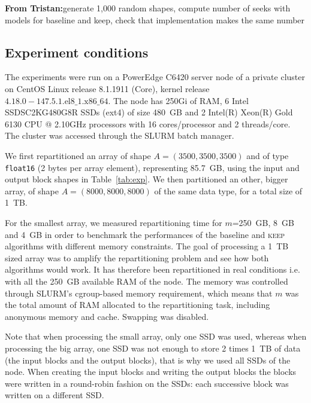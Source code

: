 \documentclass[sigconf, nonacm]{acmart}
\newcommand{\tristan}[1]{\color{orange}\textbf{From Tristan:}#1\color{black}}
\newcommand{\keep}[0]{\textsc{keep}\xspace}
\begin{document}
\tristan{generate 1,000 random shapes, compute number of seeks with models for baseline and keep,
check that implementation makes the same number}

\subsection{Experiment conditions}
The experiments were run on a PowerEdge C6420 server node of a private cluster
on CentOS Linux release 8.1.1911 (Core), kernel release
$4.18.0-147.5.1.\textrm{el}8\_1.\textrm{x}86\_64$.
The node has 250Gi of RAM, 6 Intel SSDSC2KG480G8R SSDs (ext4) of size 480~GB
and 2 Intel(R) Xeon(R) Gold 6130 CPU @ 2.10GHz processors
with 16 cores/processor and 2 threads/core.
The cluster was accessed through the SLURM batch manager.

We first repartitioned an array of shape $A=(3500,3500,3500)$ and of type
\texttt{float16} (2 bytes per array element), representing 85.7~GB,
using the input and output block shapes in Table~\ref{tab:exp}.
We then partitioned an other, bigger array, of shape $A=(8000,8000,8000)$ of the same
data type, for a total size of 1~TB.

For the smallest array, we measured repartitioning time for $m$=250~GB, 8~GB and 4~GB
in order to benchmark the performances of the baseline and \keep algorithms with
different memory constraints.
The goal of processing a 1~TB sized array was to amplify the repartitioning
problem and see how both algorithms would work. It has therefore been
repartitioned in real conditions i.e. with all the 250~GB available RAM of the node.
The memory was controlled through SLURM's cgroup-based memory requirement, which means
that $m$ was the total amount of RAM allocated to the repartitioning task,
including anonymous memory and cache. Swapping was disabled.

Note that when processing the small array, only one SSD was used, whereas when
processing the big array, one SSD was not enough to store 2 times 1~TB of data
(the input blocks and the output blocks), that is why we used all SSDs of the node.
When creating the input blocks and writing the output blocks the blocks were
written in a round-robin fashion on the SSDs: each successive block was written
on a different SSD.
\end{document}
